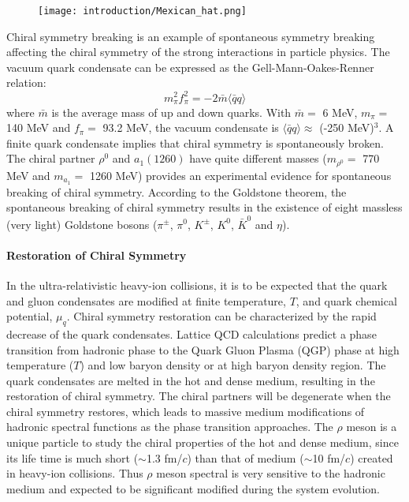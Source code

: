 \begin{figure}[htbp]
\centering
\texttt{[image: introduction/Mexican\_hat.png]}
 \label{MexicanHat}
\end{figure}

Chiral symmetry breaking is an example of spontaneous symmetry breaking affecting the chiral symmetry of the strong interactions in particle physics. The vacuum quark condensate can be expressed as the Gell-Mann-Oakes-Renner relation:
\begin{equation} 
m^{2}_{\pi}f^{2}_{\pi} = -2\bar{m}\langle\bar{q}q\rangle
\label{GORrelation}
\end{equation}
where $\bar{m}$ is the average mass of up and down quarks. With $\bar{m}=$ 6 MeV, $m_{\pi}=$ 140 MeV and $f_{\pi}=$ 93.2 MeV, the vacuum condensate is $\langle\bar{q}q\rangle \approx$ (-250 MeV)$^{3}$. A finite quark condensate implies that chiral symmetry is spontaneously broken.  The chiral partner $\rho^{0}$ and $a_{1}(1260)$ have quite different masses ($m_{\rho^{0}}=$ 770 MeV and $m_{a_{1}}=$ 1260 MeV) provides an experimental evidence for spontaneous breaking of chiral symmetry. According to the Goldstone theorem, the spontaneous breaking of chiral symmetry results in the existence of eight massless (very light) Goldstone bosons ($\pi^{\pm}$, $\pi^{0}$, $K^{\pm}$, $K^{0}$, $\bar{K}^{0}$ and $\eta$). 

\paragraph{Restoration of Chiral Symmetry}
In the ultra-relativistic heavy-ion collisions, it is to be expected that the quark and gluon condensates are modified at finite temperature, $T$, and quark chemical potential, $\mu_{q}$. Chiral symmetry restoration can be characterized by the rapid decrease of the quark condensates. Lattice QCD calculations predict a phase transition from hadronic phase to the Quark Gluon Plasma (QGP) phase at high temperature ($T$) and low baryon density or at high baryon density region. The quark condensates are melted in the hot and dense medium, resulting in the restoration of chiral symmetry. The chiral partners will be degenerate when the chiral symmetry restores, which leads to massive medium modifications of hadronic spectral functions as the phase transition approaches. The $\rho$ meson is a unique particle to study the chiral properties of the hot and dense medium, since its life time is much short ($\sim$1.3 fm/$c$) than that of medium ($\sim$10 fm/$c$) created in heavy-ion collisions. Thus $\rho$ meson spectral is very sensitive to the hadronic medium and expected to be significant modified during the system evolution.

